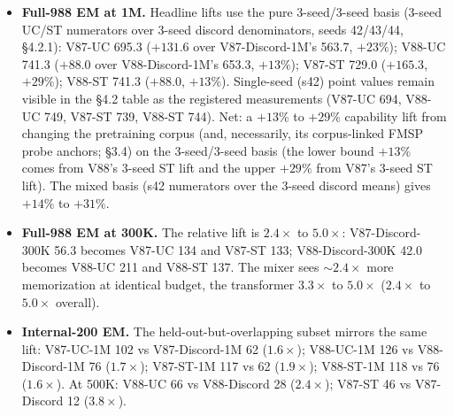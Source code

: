 \documentclass[11pt]{article}
\begin{document}
\begin{itemize}
  \item \textbf{Full-988 EM at 1M.} Headline lifts use the pure 3-seed/3-seed basis (3-seed UC/ST numerators over 3-seed discord denominators, seeds 42/43/44, \S4.2.1): V87-UC 695.3 ($+131.6$ over V87-Discord-1M's 563.7, $+23\%$); V88-UC 741.3 ($+88.0$ over V88-Discord-1M's 653.3, $+13\%$); V87-ST 729.0 ($+165.3$, $+29\%$); V88-ST 741.3 ($+88.0$, $+13\%$). Single-seed (s42) point values remain visible in the \S4.2 table as the registered measurements (V87-UC 694, V88-UC 749, V87-ST 739, V88-ST 744). Net: a $+13\%$ to $+29\%$ capability lift from changing the pretraining corpus (and, necessarily, its corpus-linked FMSP probe anchors; \S3.4) on the 3-seed/3-seed basis (the lower bound $+13\%$ comes from V88's 3-seed ST lift and the upper $+29\%$ from V87's 3-seed ST lift). The mixed basis (s42 numerators over the 3-seed discord means) gives $+14\%$ to $+31\%$.
  \item \textbf{Full-988 EM at 300K.} The relative lift is $2.4\times$ to $5.0\times$: V87-Discord-300K 56.3 becomes V87-UC 134 and V87-ST 133; V88-Discord-300K 42.0 becomes V88-UC 211 and V88-ST 137. The mixer sees $\sim$$2.4\times$ more memorization at identical budget, the transformer $3.3\times$ to $5.0\times$ ($2.4\times$ to $5.0\times$ overall).
  \item \textbf{Internal-200 EM.} The held-out-but-overlapping subset mirrors the same lift: V87-UC-1M 102 vs V87-Discord-1M 62 ($1.6\times$); V88-UC-1M 126 vs V88-Discord-1M 76 ($1.7\times$); V87-ST-1M 117 vs 62 ($1.9\times$); V88-ST-1M 118 vs 76 ($1.6\times$). At 500K: V88-UC 66 vs V88-Discord 28 ($2.4\times$); V87-ST 46 vs V87-Discord 12 ($3.8\times$).
\end{itemize}
\end{document}
